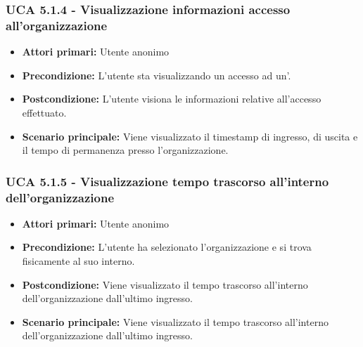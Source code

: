 \subsubsection{UCA 5.1.4 - Visualizzazione informazioni accesso all'organizzazione}
\begin{itemize}
	\item \textbf{Attori primari:} Utente anonimo
	\item \textbf{Precondizione:} L'utente sta visualizzando un accesso ad un'.
	\item \textbf{Postcondizione:} L'utente visiona le informazioni relative all'accesso effettuato.
	\item \textbf{Scenario principale:} Viene visualizzato il timestamp di ingresso, di uscita e il tempo di permanenza presso l'organizzazione.
\end{itemize}

\subsubsection{UCA 5.1.5 - Visualizzazione tempo trascorso all'interno dell'organizzazione}
\begin{itemize}
	\item \textbf{Attori primari:} Utente anonimo
	\item \textbf{Precondizione:} L'utente ha selezionato l'organizzazione e si trova fisicamente al suo interno.
	\item \textbf{Postcondizione:} Viene visualizzato il tempo trascorso all'interno dell'organizzazione dall'ultimo ingresso.
	\item \textbf{Scenario principale:} Viene visualizzato il tempo trascorso all'interno dell'organizzazione dall'ultimo ingresso.
\end{itemize}

